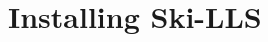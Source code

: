 \documentclass[english,11pt]{article}
\begin{document}










\section{Installing Ski-LLS}
\end{document}
